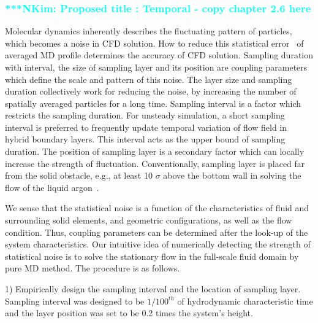 \documentclass[preprint,12pt]{elsarticle}
\newcommand{\Nkimnote}[1]{ {\textcolor{cyan} { ***NKim: #1 }}}
\newcommand{\Nkimnote}[1]{}
\begin{document}
\subsubsection{\\
\Nkimnote{Proposed title : Temporal - copy chapter 2.6 here}}



Molecular dynamics inherently describes the fluctuating pattern of particles, which becomes a noise in CFD solution. How to reduce this statistical error~\cite{Hadjicon3,Time_Mechanism} of averaged MD profile determines the accuracy of CFD solution. Sampling duration with interval, the size of sampling layer and its position are coupling parameters which define the scale and pattern of this noise. The layer size and sampling duration collectively work for reducing the noise, by increasing the number of spatially averaged particles for a long time. Sampling interval is a factor which restricts the sampling duration.  For unsteady simulation, a short sampling interval is preferred to frequently update temporal variation of flow field in hybrid boundary layers. This interval acts as the upper bound of sampling duration. The position of sampling layer is a secondary factor which can locally increase the strength of fluctuation. Conventionally, sampling layer is placed far from the solid obstacle, e.g., at least 10 $\sigma$ above the bottom wall in solving the flow of the liquid argon~\cite{Yen}.

We sense that the statistical noise is a function of the characteristics of fluid and surrounding solid elements, and geometric configurations, as well as the flow condition. Thus, coupling parameters can be determined after the look-up of the system characteristics. Our intuitive idea of numerically detecting the strength of statistical noise is to solve the stationary flow in the full-scale fluid domain by pure MD method. The procedure is as follows. 
\newline

1) Empirically design the sampling interval and the location of sampling layer. Sampling interval was designed to be $1/100^{th}$ of hydrodynamic characteristic time and the layer position was set to be 0.2 times the system's height.
\end{document}
